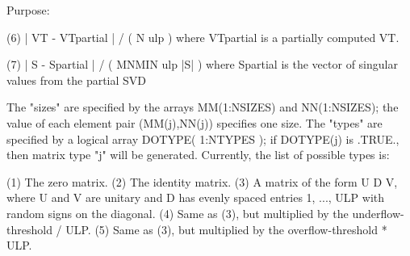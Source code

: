 \begin{DoxyParagraph}{Purpose\+: }
\begin{DoxyVerb}
 (6)   | VT - VTpartial | / ( N ulp ) where VTpartial is a partially
       computed VT.

 (7)   | S - Spartial | / ( MNMIN ulp |S| ) where Spartial is the
       vector of singular values from the partial SVD

 The "sizes" are specified by the arrays MM(1:NSIZES) and
 NN(1:NSIZES); the value of each element pair (MM(j),NN(j))
 specifies one size.  The "types" are specified by a logical array
 DOTYPE( 1:NTYPES ); if DOTYPE(j) is .TRUE., then matrix type "j"
 will be generated.
 Currently, the list of possible types is:

 (1)  The zero matrix.
 (2)  The identity matrix.
 (3)  A matrix of the form  U D V, where U and V are unitary and
      D has evenly spaced entries 1, ..., ULP with random signs
      on the diagonal.
 (4)  Same as (3), but multiplied by the underflow-threshold / ULP.
 (5)  Same as (3), but multiplied by the overflow-threshold * ULP.\end{DoxyVerb}
 
\end{DoxyParagraph}

